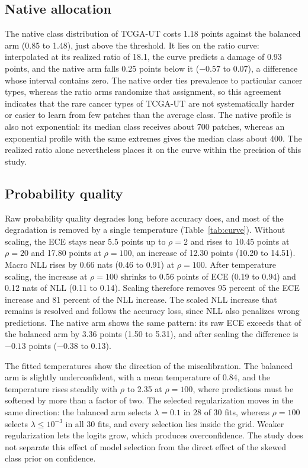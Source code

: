 \subsection{Native allocation}
\label{sec:native-results}
The native class distribution of TCGA-UT costs 1.18 points against the balanced arm (0.85 to 1.48), just above the threshold. It lies on the ratio curve: interpolated at its realized ratio of 18.1, the curve predicts a damage of 0.93 points, and the native arm falls 0.25 points below it ($-0.57$ to 0.07), a difference whose interval contains zero. The native order ties prevalence to particular cancer types, whereas the ratio arms randomize that assignment, so this agreement indicates that the rare cancer types of TCGA-UT are not systematically harder or easier to learn from few patches than the average class. The native profile is also not exponential: its median class receives about 700 patches, whereas an exponential profile with the same extremes gives the median class about 400. The realized ratio alone nevertheless places it on the curve within the precision of this study.

\subsection{Probability quality}
\label{sec:calibration-results}
Raw probability quality degrades long before accuracy does, and most of the degradation is removed by a single temperature (Table~\ref{tab:curve}). Without scaling, the ECE stays near 5.5 points up to $\rho=2$ and rises to 10.45 points at $\rho=20$ and 17.80 points at $\rho=100$, an increase of 12.30 points (10.20 to 14.51). Macro NLL rises by 0.66 nats (0.46 to 0.91) at $\rho=100$. After temperature scaling, the increase at $\rho=100$ shrinks to 0.56 points of ECE (0.19 to 0.94) and 0.12 nats of NLL (0.11 to 0.14). Scaling therefore removes 95 percent of the ECE increase and 81 percent of the NLL increase. The scaled NLL increase that remains is resolved and follows the accuracy loss, since NLL also penalizes wrong predictions. The native arm shows the same pattern: its raw ECE exceeds that of the balanced arm by 3.36 points (1.50 to 5.31), and after scaling the difference is $-0.13$ points ($-0.38$ to 0.13).

The fitted temperatures show the direction of the miscalibration. The balanced arm is slightly underconfident, with a mean temperature of 0.84, and the temperature rises steadily with $\rho$ to 2.35 at $\rho=100$, where predictions must be softened by more than a factor of two. The selected regularization moves in the same direction: the balanced arm selects $\lambda=0.1$ in 28 of 30 fits, whereas $\rho=100$ selects $\lambda\leq10^{-3}$ in all 30 fits, and every selection lies inside the grid. Weaker regularization lets the logits grow, which produces overconfidence. The study does not separate this effect of model selection from the direct effect of the skewed class prior on confidence.

